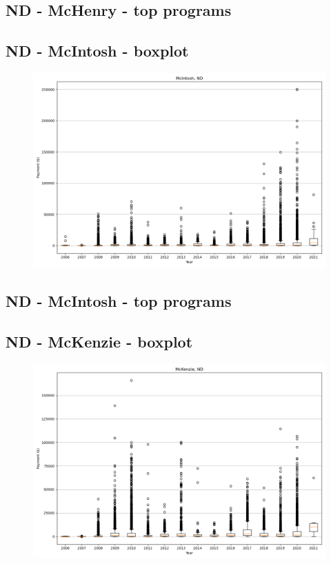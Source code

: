 \subsection*{ND - McHenry - top programs}

\newpage
\subsection*{ND - McIntosh - boxplot}
\begin{figure}[h]
\centering
\includegraphics[width=7in]{../output/boxplots/counties/McIntosh-ND_boxplot.png}
\end{figure}


\subsection*{ND - McIntosh - top programs}

\newpage
\subsection*{ND - McKenzie - boxplot}
\begin{figure}[h]
\centering
\includegraphics[width=7in]{../output/boxplots/counties/McKenzie-ND_boxplot.png}
\end{figure}


